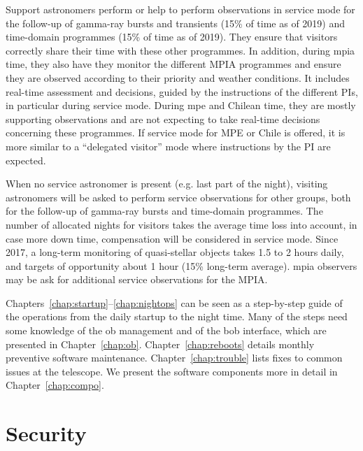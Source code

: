\documentclass[11pt,fleqn,a4paper]{book}
\begin{document}
Support astronomers perform or help to perform observations in \gls{service} mode for the follow-up of gamma-ray bursts and transients (15\% of time as of 2019) and time-domain programmes (15\% of time as of 2019). They ensure that \glspl{visitor} correctly share their time with these other programmes.  In addition, during \gls{mpia} time, they also have they monitor the different MPIA programmes and ensure they are observed according to their priority and weather conditions. It includes real-time assessment and decisions, guided by the instructions of the different PIs, in particular during service mode.  During \gls{mpe} and Chilean time, they are mostly supporting observations and are not expecting to take real-time decisions concerning these programmes.  If service mode for MPE or Chile is offered, it is more similar to a ``delegated visitor'' mode where instructions by the PI are expected.

When no \gls{service} astronomer is present (e.g. last part of the night), visiting astronomers will be asked to perform service observations for other groups, both for the follow-up of gamma-ray bursts and time-domain programmes.  The number of allocated nights for \glspl{visitor} takes the average time loss into account, in case more down time, compensation will be considered in service mode.  Since 2017, a long-term monitoring of quasi-stellar objects takes 1.5 to 2 hours daily, and targets of opportunity about 1 hour (15\% long-term average).  \gls{mpia} observers may be ask for additional \gls{service} observations for the MPIA.

Chapters~\ref{chap:startup}--\ref{chap:nightops} can be seen as a step-by-step
guide of the operations from the daily startup to the night time. Many of the
steps need some knowledge of the \gls{ob} management and of the \gls{bob}
interface, which are presented in Chapter~\ref{chap:ob}.
Chapter~\ref{chap:reboots} details monthly preventive software maintenance.
Chapter~\ref{chap:trouble} lists fixes to common issues at the telescope.  We
present the software components more in detail in Chapter~\ref{chap:compo}.

\section{Security}
\end{document}
